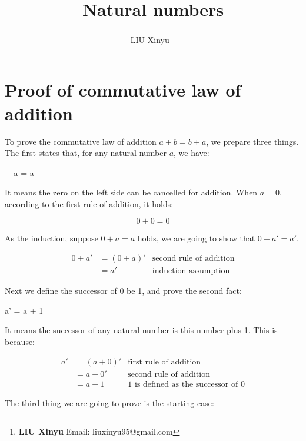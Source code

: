 \documentclass[UTF8]{article}
\begin{document}
\title{Natural numbers}

\author{LIU Xinyu
\thanks{{\bfseries LIU Xinyu} \newline
  Email: liuxinyu95@gmail.com \newline}
  }

\maketitle
\fi


\chapter*{Proof of commutative law of addition}

To prove the commutative law of addition $a + b = b + a$, we prepare three things. The first states that, for any natural number $a$, we have:

 + a = a
\label{eq:left-zero}
\ee

It means the zero on the left side can be cancelled for addition. When $a = 0$, according to the first rule of addition, it holds:

\[
0 + 0 = 0
\]

As the induction, suppose $0 + a = a$ holds, we are going to show that $0 + a' = a'$.

\[
\begin{array}{rlr}
0 + a' & = (0 + a)' & \text{second rule of addition} \\
       & = a' & \text{induction assumption}
\end{array}
\]

Next we define the successor of 0 be 1, and prove the second fact:

\be
a' = a + 1
\label{eq:one-succ}
\ee

It means the successor of any natural number is this number plus 1. This is because:

\[
\begin{array}{rlr}
a' & = (a + 0)' & \text{first rule of addition} \\
   & = a + 0' & \text{second rule of addition} \\
   & = a + 1 & \text{1 is defined as the successor of 0}
\end{array}
\]

The third thing we are going to prove is the starting case:
\end{document}
